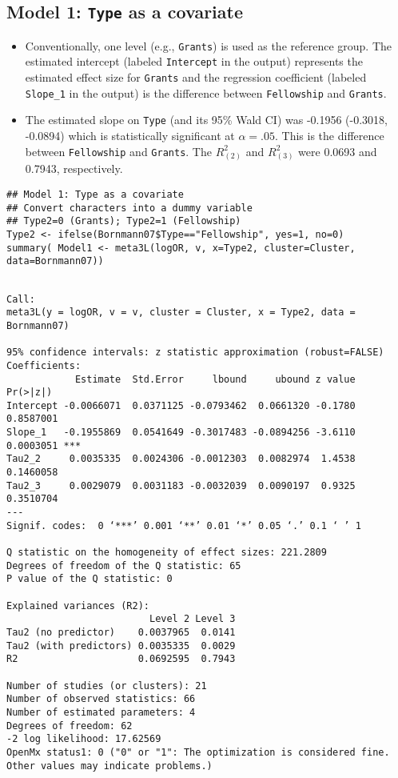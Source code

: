 \documentclass[11pt]{article}
\begin{document}
\subsection{Model 1: \texttt{Type} as a covariate}
\label{sec:org925ed55}
\begin{itemize}
\item Conventionally, one level (e.g., \texttt{Grants}) is used as the reference group. The estimated intercept (labeled \texttt{Intercept} in the output) represents the estimated effect size for \texttt{Grants} and the regression coefficient (labeled \texttt{Slope\_1} in the output) is the difference between \texttt{Fellowship} and \texttt{Grants}.
\item The estimated slope on \texttt{Type} (and its 95\% Wald CI) was -0.1956 (-0.3018, -0.0894) which is statistically significant at \(\alpha=.05\). This is the difference between \texttt{Fellowship} and \texttt{Grants}. The \(R^2_{(2)}\) and \(R^2_{(3)}\) were 0.0693 and 0.7943, respectively.
\end{itemize}

\begin{verbatim}
## Model 1: Type as a covariate  
## Convert characters into a dummy variable
## Type2=0 (Grants); Type2=1 (Fellowship)    
Type2 <- ifelse(Bornmann07$Type=="Fellowship", yes=1, no=0)
summary( Model1 <- meta3L(logOR, v, x=Type2, cluster=Cluster, data=Bornmann07)) 
\end{verbatim}

\begin{verbatim}

Call:
meta3L(y = logOR, v = v, cluster = Cluster, x = Type2, data = Bornmann07)

95% confidence intervals: z statistic approximation (robust=FALSE)
Coefficients:
            Estimate  Std.Error     lbound     ubound z value  Pr(>|z|)    
Intercept -0.0066071  0.0371125 -0.0793462  0.0661320 -0.1780 0.8587001    
Slope_1   -0.1955869  0.0541649 -0.3017483 -0.0894256 -3.6110 0.0003051 ***
Tau2_2     0.0035335  0.0024306 -0.0012303  0.0082974  1.4538 0.1460058    
Tau2_3     0.0029079  0.0031183 -0.0032039  0.0090197  0.9325 0.3510704    
---
Signif. codes:  0 ‘***’ 0.001 ‘**’ 0.01 ‘*’ 0.05 ‘.’ 0.1 ‘ ’ 1

Q statistic on the homogeneity of effect sizes: 221.2809
Degrees of freedom of the Q statistic: 65
P value of the Q statistic: 0

Explained variances (R2):
                         Level 2 Level 3
Tau2 (no predictor)    0.0037965  0.0141
Tau2 (with predictors) 0.0035335  0.0029
R2                     0.0692595  0.7943

Number of studies (or clusters): 21
Number of observed statistics: 66
Number of estimated parameters: 4
Degrees of freedom: 62
-2 log likelihood: 17.62569 
OpenMx status1: 0 ("0" or "1": The optimization is considered fine.
Other values may indicate problems.)
\end{verbatim}
\end{document}
